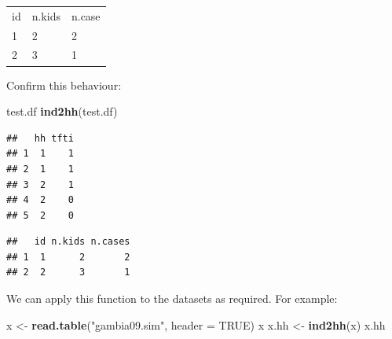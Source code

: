 \documentclass[12pt,a4paper]{book}
\newenvironment{Shaded}{\begin{snugshade}}{\end{snugshade}}
\newcommand{\KeywordTok}[1]{\textcolor[rgb]{0.13,0.29,0.53}{\textbf{#1}}}
\newcommand{\DataTypeTok}[1]{\textcolor[rgb]{0.13,0.29,0.53}{#1}}
\newcommand{\StringTok}[1]{\textcolor[rgb]{0.31,0.60,0.02}{#1}}
\newcommand{\OtherTok}[1]{\textcolor[rgb]{0.56,0.35,0.01}{#1}}
\newcommand{\NormalTok}[1]{#1}
\theoremstyle{definition}
\theoremstyle{definition}
\theoremstyle{definition}
\theoremstyle{remark}
\begin{document}
\begin{longtable}[]{@{}lll@{}}
\toprule
\begin{minipage}[t]{0.08\columnwidth}\raggedright
id\strut
\end{minipage} & \begin{minipage}[t]{0.14\columnwidth}\raggedright
n.kids\strut
\end{minipage} & \begin{minipage}[t]{0.14\columnwidth}\raggedright
n.case\strut
\end{minipage}\tabularnewline
\begin{minipage}[t]{0.08\columnwidth}\raggedright
1\strut
\end{minipage} & \begin{minipage}[t]{0.14\columnwidth}\raggedright
2\strut
\end{minipage} & \begin{minipage}[t]{0.14\columnwidth}\raggedright
2\strut
\end{minipage}\tabularnewline
\begin{minipage}[t]{0.08\columnwidth}\raggedright
2\strut
\end{minipage} & \begin{minipage}[t]{0.14\columnwidth}\raggedright
3\strut
\end{minipage} & \begin{minipage}[t]{0.14\columnwidth}\raggedright
1\strut
\end{minipage}\tabularnewline
\bottomrule
\end{longtable}

Confirm this behaviour:

\begin{Shaded}
\begin{Highlighting}[]
\NormalTok{test.df}
\KeywordTok{ind2hh}\NormalTok{(test.df)}
\end{Highlighting}
\end{Shaded}

\begin{verbatim}
##   hh tfti
## 1  1    1
## 2  1    1
## 3  2    1
## 4  2    0
## 5  2    0
\end{verbatim}

\begin{verbatim}
##   id n.kids n.cases
## 1  1      2       2
## 2  2      3       1
\end{verbatim}

We can apply this function to the datasets as required. For example:

\begin{Shaded}
\begin{Highlighting}[]
\NormalTok{x <-}\StringTok{ }\KeywordTok{read.table}\NormalTok{(}\StringTok{"gambia09.sim"}\NormalTok{, }\DataTypeTok{header =} \OtherTok{TRUE}\NormalTok{)}
\NormalTok{x}
\NormalTok{x.hh <-}\StringTok{ }\KeywordTok{ind2hh}\NormalTok{(x)}
\NormalTok{x.hh}
\end{Highlighting}
\end{Shaded}
\end{document}
